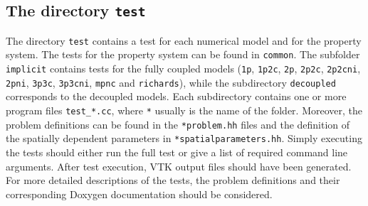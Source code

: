 \subsection{The directory \texttt{test}}
\label{sec:test}
The directory \texttt{test} contains a test for each numerical model and for
the property system. The tests for the property system can be found in \texttt{common}.
The subfolder \texttt{implicit} contains tests for the fully
coupled models (\texttt{1p},  \texttt{1p2c},  \texttt{2p},  \texttt{2p2c},
\texttt{2p2cni},  \texttt{2pni}, \texttt{3p3c},  \texttt{3p3cni},  \texttt{mpnc}
and \texttt{richards}), while the subdirectory \texttt{decoupled} corresponds to the decoupled models.
Each subdirectory contains one or more program files \texttt{test\_*.cc}, where \texttt{*} usually is the
name of the folder. Moreover, the problem definitions can be found
in the \texttt{*problem.hh} files and the definition of the spatially dependent
parameters in \texttt{*spatialparameters.hh}. Simply executing the tests should either run the
full test or give a list of required command line arguments. After test execution,
VTK output files should have been generated.
For more detailed descriptions of the tests, the problem definitions and their corresponding
Doxygen documentation should be considered.

